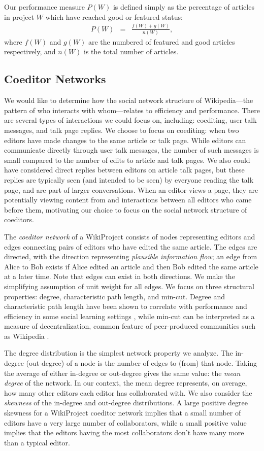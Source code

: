 \documentclass[letterpaper,twocolumn,10pt]{article}
\newcommand{\beq}{\begin{eqnarray}}
\newcommand{\eeq}{\end{eqnarray}}
\newcommand{\+}{\phantom{-}}
\begin{document}
Our performance measure $P(W)$ is defined simply as
the percentage of articles in project $W$ which have reached
good or featured status:
\beq
P(W) &=& \frac{f(W) + g(W)}{n(W)},
\eeq
where $f(W)$ and $g(W)$ are the numbered of featured and good articles respectively,
and $n(W)$ is the total number of articles.

\subsection{Coeditor Networks}

We would like to determine how the social network structure of
Wikipedia---the pattern of who interacts with whom---relates to
efficiency and performance.
There are several types of interactions we could focus on,
including:
coediting, user talk messages, and talk page replies.
We choose to focus on coediting: when two editors have made changes to the
same article or talk page.
While editors can communicate directly through user talk messages,
the number of such messages is small compared to the number of edits to article
and talk pages.
We also could have considered direct replies between editors on article talk
pages, but these replies are typically seen (and intended to be seen)
by everyone reading the talk page,
and are part of larger conversations.
When an editor views a page,
they are potentially viewing content from and interactions
between all editors who came before them,
motivating our choice to focus on the social network structure of
coeditors.

The {\em coeditor network} of a WikiProject consists of nodes representing editors
and edges connecting pairs of editors who have edited the same article.
The edges are directed, with the direction representing
{\em plausible information flow};
an edge from Alice to Bob exists if Alice edited an article and then Bob edited the same article at
a later time. Note that edges can exist in both directions. 
We make the simplifying assumption of unit weight for all edges.
We focus on three structural properties:
degree, characteristic path length, and min-cut.
Degree and characteristic path length have been shown to correlate with
performance and efficiency in some social learning settings
\cite{golub_naive_2010,mason_propagation_2008,grim_scientific_2013},
while min-cut can be interpreted as a measure of decentralization,
common feature of peer-produced communities such as Wikipedia
\cite{benkler_wealth_2006}.

The degree distribution is the simplest network property we analyze.
The in-degree (out-degree) of a node is the number of edges to (from) that node.
Taking the average of either in-degree or out-degree gives the same value:
the {\em mean degree} of the network.
In our context, the mean degree represents, on average,
how many other editors each editor has collaborated with.
We also consider the {\em skewness} of the in-degree and out-degree distributions.
A large positive degree skewness for a WikiProject coeditor network
implies that a small number of editors have a very large number of collaborators,
while a small positive value implies that the editors having the most collaborators
don't have many more than a typical editor.
\end{document}
